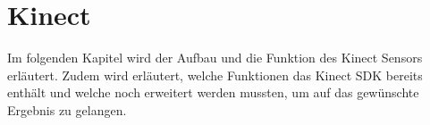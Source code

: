 \chapter{Kinect}      %
Im folgenden Kapitel wird der Aufbau und die Funktion des Kinect Sensors erläutert. Zudem
wird erläutert, welche Funktionen das Kinect SDK bereits enthält und welche noch erweitert
werden mussten, um auf das gewünschte Ergebnis zu gelangen.



